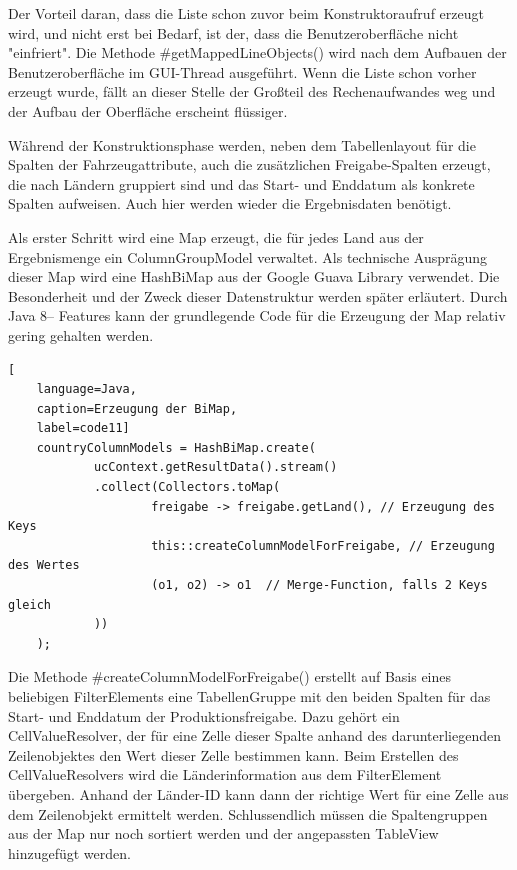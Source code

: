 Der Vorteil daran, dass die Liste schon zuvor beim Konstruktoraufruf erzeugt wird, und nicht erst bei Bedarf, ist der, dass die Benutzeroberfläche nicht "einfriert". Die Methode \#getMappedLineObjects() wird nach dem Aufbauen der Benutzeroberfläche im GUI-Thread ausgeführt. Wenn die Liste schon vorher erzeugt wurde, fällt an dieser Stelle der Großteil des Rechenaufwandes weg und der Aufbau der Oberfläche erscheint flüssiger.

Während der Konstruktionsphase werden, neben dem Tabellenlayout für die Spalten der Fahrzeugattribute, auch die zusätzlichen Freigabe-Spalten erzeugt, die nach Ländern gruppiert sind und das Start- und Enddatum als konkrete Spalten aufweisen. Auch hier werden wieder die Ergebnisdaten benötigt.

Als erster Schritt wird eine Map erzeugt, die für jedes Land aus der Ergebnismenge ein ColumnGroupModel verwaltet. Als technische Ausprägung dieser Map wird eine HashBiMap aus der Google Guava Library verwendet. Die Besonderheit und der Zweck dieser Datenstruktur werden später erläutert. Durch Java 8– Features kann der grundlegende Code für die Erzeugung der Map relativ gering gehalten werden.

\begin{lstlisting}[
    language=Java,
    caption=Erzeugung der BiMap,
    label=code11]
	countryColumnModels = HashBiMap.create(
			ucContext.getResultData().stream()
			.collect(Collectors.toMap(
					freigabe -> freigabe.getLand(),	// Erzeugung des Keys
					this::createColumnModelForFreigabe, // Erzeugung des Wertes
					(o1, o2) -> o1	// Merge-Function, falls 2 Keys gleich
	 		))
	);
\end{lstlisting}

Die Methode \#createColumnModelForFreigabe() erstellt auf Basis eines beliebigen FilterElements eine TabellenGruppe mit den beiden Spalten für das Start- und Enddatum der Produktionsfreigabe. Dazu gehört ein CellValueResolver, der für eine Zelle dieser Spalte anhand des darunterliegenden Zeilenobjektes den Wert dieser Zelle bestimmen kann. Beim Erstellen des CellValueResolvers wird die Länderinformation aus dem FilterElement übergeben. Anhand der Länder-ID kann dann der richtige Wert für eine Zelle aus dem Zeilenobjekt ermittelt werden. Schlussendlich müssen die Spaltengruppen aus der Map nur noch sortiert werden und der angepassten TableView hinzugefügt werden.


